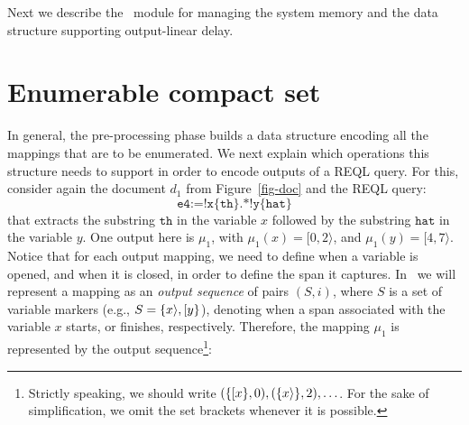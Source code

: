 Next we describe the \rematch\ module for managing the system memory and the data structure supporting output-linear delay.

\section{Enumerable compact set} 
In general, the pre-processing phase builds a  data structure encoding all the mappings that are to be enumerated. We next explain which operations this structure needs to support in order to encode outputs of a REQL query. For this, consider again the document $d_1$ from Figure~\ref{fig-doc} and the REQL query:
$$
\texttt{e4} := \texttt{!x\{th\}.*!y\{hat\}}
$$
%			
that extracts the substring $\texttt{th}$ in the variable $x$ followed by the substring $\texttt{hat}$ in the variable $y$.
One output here is $\mu_1$, with $\mu_1(x) = [0,2\rangle$, and $\mu_1(y) = [4,7\rangle$. Notice that for each output mapping, we need to define when a variable is opened, and when it is closed, in order to define the span it captures. In \rematch\ we will represent a mapping as an \emph{output sequence} of pairs $(S,i)$, where $S$ is a set of variable markers (e.g., $S=\{x \rangle, [ y\}$), denoting when a span associated with the variable $x$ starts, or finishes, respectively. Therefore, the mapping $\mu_1$ is represented by the output sequence\footnote{Strictly speaking, we should write $(\{[ x\},0),(\{x \rangle\},2),\ldots$. For the sake of simplification, we omit the set brackets whenever it is possible.}:
